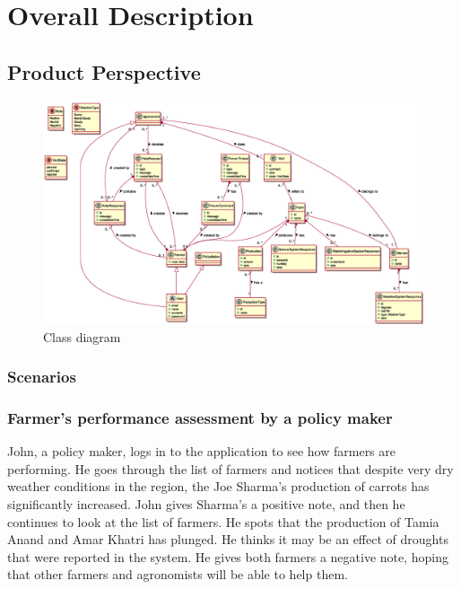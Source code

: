 \chapter{Overall Description}

\section{Product Perspective}

\begin{figure}[!ht]
    \centering
    \includegraphics[width=0.96\textheight, keepaspectratio, origin=c, angle=90]{diagrams/class}
    \caption{Class diagram}
    \label{fig:class_diagram}
\end{figure}




\subsection{Scenarios}
\subsection*{Farmer's performance assessment by a policy maker}
John, a policy maker, logs in to the application to see how farmers are performing. He goes through the list of farmers and notices that despite very dry weather conditions in the region, the Joe Sharma's production of carrots has significantly increased. John gives Sharma's a positive note, and then he continues to look at the list of farmers. He spots that the production of Tamia Anand and Amar Khatri has plunged. He thinks it may be an effect of droughts that were reported in the system. He gives both farmers a negative note, hoping that other farmers and agronomists will be able to help them. 

